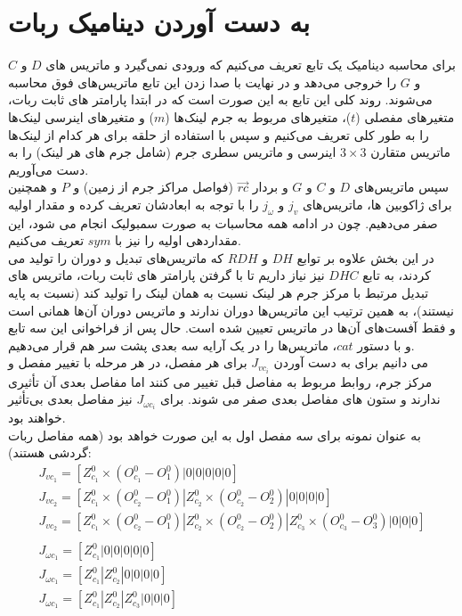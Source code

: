 \documentclass{article}
\begin{document}
\section{به دست آوردن دینامیک ربات}
برای محاسبه دینامیک یک تابع تعریف می‌کنیم که ورودی نمی‌گیرد و ماتریس های $D$ و $C$ و $G$ را خروجی می‌دهد و در نهایت با صدا زدن این تابع ماتریس‌های فوق محاسبه می‌شوند.
روند کلی این تابع به این صورت است که در ابتدا پارامتر های ثابت ربات، متغیر‌های مفصلی ($t$)، متغیر‌های مربوط به جرم لینک‌ها ($m$) و متغیر‌های اینرسی لینک‌ها را به طور کلی تعریف می‌کنیم و سپس با استفاده از حلقه برای هر کدام از لینک‌ها ماتریس متقارن $3\times3$ اینرسی و ماتریس سطری جرم (شامل جرم های هر لینک) را به دست می‌آوریم.
\\
سپس ماتریس‌های $D$ و $C$ و $G$ و بردار  $\overrightarrow{rc}$ (فواصل مراکز جرم از زمین) و $P$ و همچنین برای ژاکوبین ها، ماتریس‌های $j_{v}$ و $j_{\omega}$ را با توجه به ابعادشان تعریف کرده و مقدار اولیه صفر می‌دهیم. چون در ادامه همه محاسبات به صورت سمبولیک انجام می شود، این مقداردهی اولیه را نیز با $sym$ تعریف می‌کنیم.
\\
در این بخش علاوه بر توابع $DH$ و $RDH$ که ماتریس‌های تبدیل و دوران را تولید می کردند، به تابع $DHC$ نیز نیاز داریم تا با گرفتن پارامتر های ثابت ربات، ماتریس های تبدیل مرتبط با مرکز جرم هر لینک نسبت به همان لینک را تولید کند (نسبت به پایه نیستند)، به همین ترتیب این ماتریس‌ها دوران ندارند و ماتریس دوران آن‌ها همانی است و فقط آفست‌های آن‌ها در ماتریس  تعیین شده است.
حال پس از فراخوانی این سه تابع و با دستور $cat$، ماتریس‌ها را در یک آرایه سه بعدی پشت سر هم قرار می‌دهیم.
\\
می دانیم برای به دست آوردن $J_{vc_i}$ برای هر مفصل، در هر مرحله با تغییر مفصل و مرکز جرم، روابط مربوط به مفاصل قبل تغییر می کنند اما مفاصل بعدی آن تأثیری ندارند و ستون های مفاصل بعدی صفر می شوند. برای $J_{\omega c_i}$ نیز مفاصل بعدی بی‌تأثیر خواهند بود.
\\
به عنوان نمونه برای سه مفصل اول به این صورت خواهد بود (همه مفاصل ربات گردشی هستند):
\\
\begin{gather*}
J_{vc_{1}} = [Z_{c_{1}}^{0} \times (O_{c_{1}}^{0} - O_{1}^{0})|0|0|0|0|0] \\
J_{vc_{2}} = [Z_{c_{1}}^{0} \times (O_{c_{2}}^{0} - O_{1}^{0})|Z_{c_{2}}^{0} \times (O_{c_{2}}^{0} - O_{2}^{0})|0|0|0|0] \\
J_{vc_{2}} = [Z_{c_{1}}^{0} \times (O_{c_{2}}^{0} - O_{1}^{0})|Z_{c_{2}}^{0} \times (O_{c_{2}}^{0} - O_{2}^{0})|Z_{c_{3}}^{0} \times (O_{c_{3}}^{0} - O_{3}^{0})|0|0|0] \\
\\
J_{\omega c_{1}} = [Z_{c_{1}}^0|0|0|0|0|0]\\
J_{\omega c_{1}} = [Z_{c_{1}}^0|Z_{c_{2}}^0|0|0|0|0]\\
J_{\omega c_{1}} = [Z_{c_{1}}^0|Z_{c_{2}}^0|Z_{c_{3}}^0|0|0|0]\\
\end{gather*}
\end{document}
